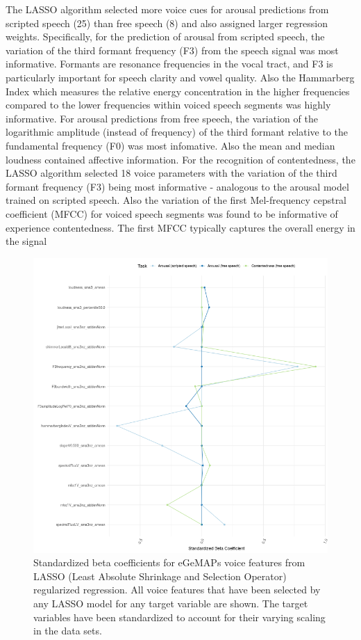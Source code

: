 \documentclass[
  english,
  man,floatsintext]{apa6}
\begin{document}
The LASSO algorithm selected more voice cues for arousal predictions from scripted speech (25) than free speech (8) and also assigned larger regression weights.
Specifically, for the prediction of arousal from scripted speech, the variation of the third formant frequency (F3) from the speech signal was most informative. Formants are resonance frequencies in the vocal tract, and F3 is particularly important for speech clarity and vowel quality. Also the Hammarberg Index which measures the relative energy concentration in the higher frequencies compared to the lower frequencies within voiced speech segments was highly informative.
For arousal predictions from free speech, the variation of the logarithmic amplitude (instead of frequency) of the third formant relative to the fundamental frequency (F0) was most infomative. Also the mean and median loudness contained affective information.
For the recognition of contentedness, the LASSO algorithm selected 18 voice parameters with the variation of the third formant frequency (F3) being most informative - analogous to the arousal model trained on scripted speech. Also the variation of the first Mel-frequency cepstral coefficient (MFCC) for voiced speech segments was found to be informative of experience contentedness. The first MFCC typically captures the overall energy in the signal

\begin{figure}

{\centering \includegraphics[width=1\linewidth,height=1\textheight]{../figures/betas_plot} 

}

\caption[LASSO betas]{Standardized beta coefficients for eGeMAPs voice features from LASSO (Least Absolute Shrinkage and Selection Operator) regularized regression. All voice features that have been selected by any LASSO model for any target variable are shown. The target variables have been standardized to account for their varying scaling in the data sets.}\label{fig:lassobetas}
\end{figure}
\end{document}

